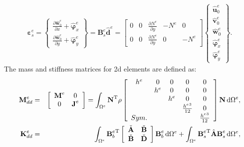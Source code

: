 \documentclass[11pt,a4paper,final]{report}
\theoremstyle{plain}
\begin{document}
\begin{eqnarray}
	\boldsymbol{\varepsilon}_s^e = 
	\left \{ \begin{array}{c}
		\frac{\partial \widehat{\textbf{w}}_0^e}{\partial x} + \widehat{\boldsymbol{\varphi}}_x^e\\
		\frac{\partial \widehat{\textbf{w}}_0^e}{\partial y} + \widehat{\boldsymbol{\varphi}}_y^e
	\end{array} \right\} = 
	\textbf{B}_s^e\widehat{\textbf{d}}^e = 
	\left [
	\begin{array}{ccccc}
		0 & 0 & \frac{\partial N^e}{\partial y} & -N^e & 0\\
		0 & 0 & \frac{\partial N^e}{\partial y} & 0 & -N^e
	\end{array} \right]
	\left \{ \begin{array}{c}
		\widehat{\textbf{u}}_0^e \\
		\widehat{\textbf{v}}_0^e \\
		\widehat{\textbf{w}}_0^e \\
		\widehat{\boldsymbol{\varphi}}_x^e \\
		\widehat{\boldsymbol{\varphi}}_y^e
	\end{array} \right\}.
\end{eqnarray}
The mass and stiffness matrices for \ac{2d} elements are defined as:
\begin{eqnarray}
	\textbf{M}_{dd}^e & = &
	\left [
	\begin{array}{cc}
		\textbf{M}^e & 0\\
		0 & \textbf{J}^e
	\end{array}
	\right] =
	\int_{\Omega^e}\textbf{N}^{\mathrm{T}}\rho
	\left [
	\begin{array}{ccccc}
		h^e & 0 & 0 & 0 & 0 \\
		& h^e & 0 & 0 & 0 \\
		&  & h^e & 0 & 0\\
		&  &  & \frac{{h^e}^3}{12} & 0\\
		Sym. &  &  &  & \frac{{h^e}^3}{12}
	\end{array} \right]
	\textbf{N} \mathop{}\!\mathrm{d}\Omega^e,\\
	\textbf{K}_{dd}^e & = & \int_{\Omega^e}{\textbf{B}_b^e}^{\mathrm{T}}
	\left[
	\begin{array}{cc}
		\check{\textbf{A}} & \check{\textbf{B}}\\
		\check{\textbf{B}} & \check{\textbf{D}}
	\end{array} \right]
	\textbf{B}_b^e \mathop{}\!\mathrm{d} \Omega^e+\int_{\Omega^e}{\textbf{B}_s^e}^{\mathrm{T}}\hat{\textbf{A}}\textbf{B}_s^e\mathop{}\!\mathrm{d} \Omega^e,
\end{eqnarray}
\end{document}
